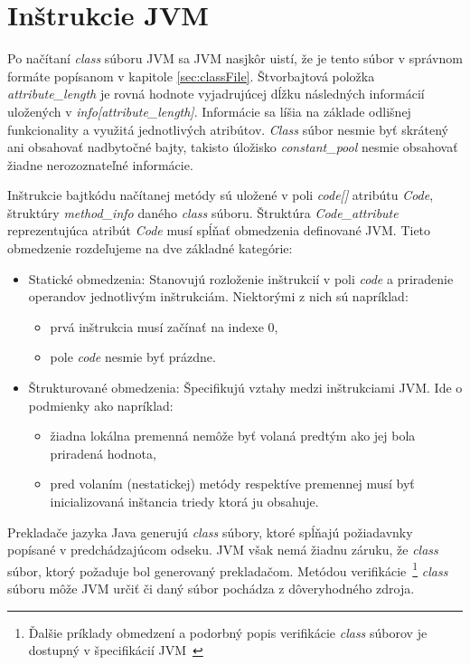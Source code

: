 \documentclass[11pt,final,oneside]{fithesis}
\begin{document}
\section{Inštrukcie JVM}
Po načítaní \textit{class} súboru JVM sa JVM nasjkôr uistí, že je tento súbor
v správnom formáte popísanom v kapitole \ref{sec:classFile}. Štvorbajtová
položka \textit{attribute\_length} je rovná hodnote vyjadrujúcej
dĺžku následných informácií uložených v \textit{info[attribute\_length]}.
Informácie sa líšia na základe odlišnej funkcionality a využitá jednotlivých
atribútov. \textit{Class} súbor nesmie byť skrátený ani obsahovať nadbytočné
bajty, takisto úložisko \textit{constant\_pool} nesmie obsahovať žiadne
nerozoznateľné informácie.

Inštrukcie bajtkódu načítanej metódy sú uložené v poli \textit{code[]}
atribútu \textit{Code}, štruktúry \textit{method\_info} daného \textit{class}
súboru. Štruktúra \textit{Code\_attribute} reprezentujúca atribút \textit{Code}
musí spĺňať obmedzenia definované JVM. Tieto obmedzenie rozdeľujeme na dve
základné kategórie: 

\begin{itemize}
\item Statické obmedzenia: Stanovujú rozloženie inštrukcií v poli \textit{code}
a priradenie operandov jednotlivým inštrukciám. Niektorými z nich sú napríklad:
\begin{itemize}
\item prvá inštrukcia musí začínať na indexe 0,
\item pole \textit{code} nesmie byť prázdne.
\end{itemize}
\item Štrukturované obmedzenia: Špecifikujú vztahy medzi inštrukciami JVM. Ide
o podmienky ako napríklad:
\begin{itemize}
\item žiadna lokálna premenná nemôže byť volaná predtým ako jej bola priradená
hodnota,
\item pred volaním (nestatickej) metódy respektíve premennej musí byť
inicializovaná inštancia triedy ktorá ju obsahuje.
\end{itemize}
\end{itemize}

Prekladače jazyka Java generujú \textit{class} súbory, ktoré spĺňajú požiadavnky
popísané v predchádzajúcom odseku. JVM však nemá žiadnu záruku, že
\textit{class} súbor, ktorý požaduje bol generovaný prekladačom. Metódou
verifikácie~\footnote{Ďalšie príklady obmedzení a podorbný popis verifikácie
\textit{class} súborov je dostupný v špecifikácií
JVM~\cite{Lindholm:2013:JVM:2462629}} \textit{class} súboru môže JVM určiť či
daný súbor pochádza z dôveryhodného zdroja.
\end{document}

